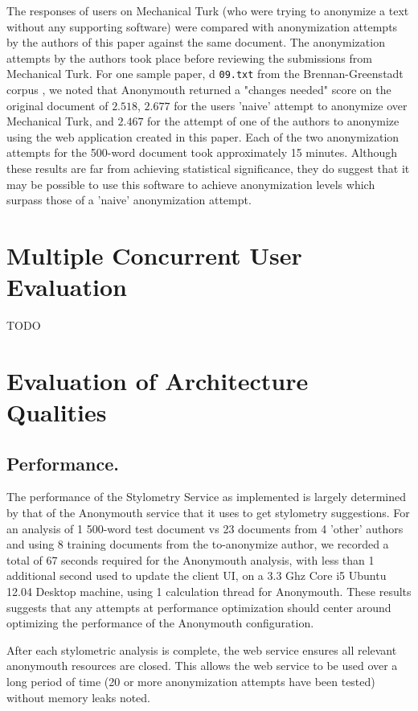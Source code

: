 \documentclass[letterpaper]{article}
\begin{document}
The responses of users on Mechanical Turk (who were trying to
anonymize a text without any supporting software) were compared with
anonymization attempts by the authors of this paper against the same
document. The anonymization attempts by the authors took place before
reviewing the submissions from Mechanical Turk. For one sample paper,
d \texttt{09.txt} from the Brennan-Greenstadt corpus \cite{BrennanG09}
, we noted that Anonymouth returned a "changes needed"
score on the original document of $2.518$, $2.677$ for the users 'naive'
attempt to anonymize over Mechanical Turk, and $2.467$ for the attempt
of one of the authors to anonymize using the web application created
in this paper. Each of the two anonymization attempts for the 500-word
document took approximately 15 minutes. Although these results are far
from achieving statistical significance, they do suggest that it may
be possible to use this software to achieve anonymization levels which
surpass those of a 'naive' anonymization attempt.

\section{Multiple Concurrent User Evaluation}

TODO

\section{Evaluation of Architecture Qualities}

\subsection{Performance.}

The performance of the Stylometry Service as implemented is largely
determined by that of the Anonymouth service that it uses to get
stylometry suggestions. For an analysis of 1 500-word test document vs
23 documents from 4 'other' authors and using 8 training documents
from the to-anonymize author, we recorded a total of 67 seconds
required for the Anonymouth analysis, with less than 1 additional
second used to update the client UI, on a 3.3 Ghz Core i5 Ubuntu 12.04
Desktop machine, using 1 calculation thread for Anonymouth. These
results suggests that any attempts at performance optimization should
center around optimizing the performance of the Anonymouth
configuration.

After each stylometric analysis is complete, the web service ensures
all relevant anonymouth resources are closed. This allows the web
service to be used over a long period of time (20 or more
anonymization attempts have been tested) without memory leaks noted.
\end{document}
